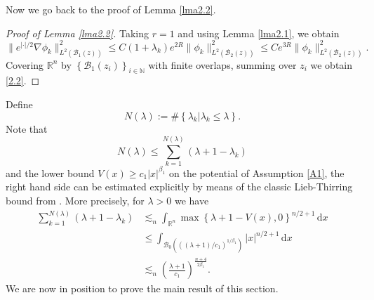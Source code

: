 \documentclass{article}
\numberwithin{equation}{section}
\renewcommand{\d}{\,\mathrm{d}}
\newcommand\N{\ensuremath{\mathbb{N}}}
\newcommand\R{\ensuremath{\mathbb{R}}}
\numberwithin{equation}{section}
\theoremstyle{definition}
\begin{document}
Now we go back to the proof of Lemma \ref{lma2.2}.
\begin{proof}[Proof of Lemma \ref{lma2.2}] 
	Taking $r=1$ and using Lemma \ref{lma2.1}, we obtain
\begin{equation}
	\|e^{|\cdot | /2} \nabla \phi_k\|^2_{L^2(\mathcal{B}_1(z))}\le C (1+\lambda_k)e^{2R}\|\phi_k\|^2_{L^2(\mathcal{B}_2(z))}\le C e^{3R} \|\phi_k\|^2_{L^2(\mathcal{B}_2(z))}.  
\end{equation}
Covering $\R^{n}$ by $\left\{\mathcal{B}_1(z_i)\right\}_{i \in \N}$ with finite overlaps, summing over $z_i$ we obtain
\eqref{2.2}.
\end{proof}

Define
\begin{equation}
	N(\lambda):=\# \left\{\lambda_k\lvert \lambda_k\le \lambda\right\}. 
\end{equation}
Note that 
\begin{equation}
	N(\lambda)\le \sum_{k=1}^{N(\lambda)} (\lambda+1-\lambda_k)
\end{equation}
and the lower bound $V(x)\ge c_1|x|^{\beta_1}$ on the potential of Assumption \ref{A1}, the right hand side can be estimated explicitly by means of the classic Lieb-Thirring bound from \cite[Theorem 1]{lieb2001inequalities}. More precisely, for $\lambda >0$
we have
\begin{equation}\label{2.8}
	\begin{aligned}
		\sum_{k=1}^{N(\lambda)} (\lambda+1-\lambda_k)&\lesssim_n \int_{\R^{n}}\max \left\{\lambda+1-V(x),0\right\} ^{n /2+1}\d x\\
							     &\le \int_{\mathcal{B}_0\left( ((\lambda+1) /c_1)^{1 /\beta_1}  \right) }|x|^{n /2+1}\d x\\
							     &\lesssim_n \left( \frac{\lambda+1}{c_1} \right) ^{ \frac{n+4}{2 \beta_1} }. 
	\end{aligned} 
\end{equation}
We are now in position to prove the main result of this section.
\end{document}
